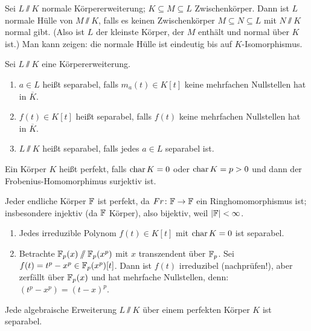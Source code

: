 \documentclass[12pt,a4paper]{scrartcl}
\begin{document}
\begin{bem} Sei $L\sslash K$ normale Körpererweiterung; $K\subseteq M\subseteq L$ Zwischenkörper. Dann ist $L$ normale Hülle von $M\sslash K$, falls es keinen Zwischenkörper $M\subseteq N\subseteq L$ mit $N\sslash K$ normal gibt. (Also ist $L$ der kleinste Körper, der $M$ enthält und normal über $K$ ist.) Man kann zeigen: die normale Hülle ist eindeutig bis auf $K$-Isomorphismus.
\end{bem}

\begin{defi} Sei $L\sslash K$ eine Körpererweiterung. \begin{enumerate}
		\item $a\in L$ heißt separabel, falls $m_a(t)\in K[t]$ keine mehrfachen Nullstellen hat in $\overline{K}$. %
		\item $f(t)\in K[t]$ heißt separabel, falls $f(t)$ keine mehrfachen Nullstellen hat in $\overline{K}$.
		\item $L\sslash K$ heißt separabel, falls jedes $a\in L$ separabel ist.
	\end{enumerate}
\end{defi}

\begin{defi}
	Ein Körper $K$ heißt perfekt, falls $\operatorname{char} K = 0$ oder $\operatorname{char} K = p>0$ und dann der Frobenius-Homomorphimus surjektiv ist.
\end{defi}
\begin{bsp} Jeder endliche Körper $\mathbb F$ ist perfekt, da $Fr\colon \mathbb F\to \mathbb F$ ein Ringhomomorphismus ist; insbesondere injektiv (da $\mathbb F$ Körper), also bijektiv, weil $|\mathbb F|<\infty$.
\end{bsp}
\begin{bsp}\leavevmode\begin{enumerate}
	\item Jedes irreduzible Polynom $f(t)\in K[t]$ mit $\operatorname{char} K = 0$ ist separabel.
	\item Betrachte $\mathbb F_p(x)\sslash \mathbb F_p(x^p)$ mit $x$ transzendent über $\mathbb F_p$. Sei $f(t) = t^p-x^p\in \mathbb F_p(x^p)[t]$. Dann ist $f(t)$ irreduzibel (nachprüfen!), aber zerfällt über $\mathbb F_p(x)$ und hat mehrfache Nullstellen, denn: $(t^p-x^p) = (t-x)^p$.
	\end{enumerate}
\end{bsp}

\begin{satz}
	Jede algebraische Erweiterung $L\sslash K$ über einem perfekten Körper $K$ ist separabel.
\end{satz}
\end{document}
